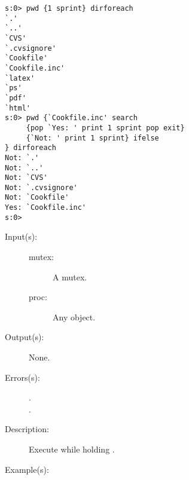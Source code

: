 \begin{description}
\begin{description}
\begin{verbatim}
s:0> pwd {1 sprint} dirforeach
`.'
`..'
`CVS'
`.cvsignore'
`Cookfile'
`Cookfile.inc'
`latex'
`ps'
`pdf'
`html'
s:0> pwd {`Cookfile.inc' search
     {pop `Yes: ' print 1 sprint pop exit}
     {`Not: ' print 1 sprint} ifelse
} dirforeach
Not: `.'
Not: `..'
Not: `CVS'
Not: `.cvsignore'
Not: `Cookfile'
Yes: `Cookfile.inc'
s:0>
		\end{verbatim}
	\end{description}
\label{systemdict:monitor}
\item[{\stilop{mutex proc}{monitor}{--}}: ]
	\begin{description}\item[]
	\item[Input(s): ]
		\begin{description}\item[]
		\item[mutex: ]
			A mutex.
		\item[proc: ]
			Any object.
		\end{description}
	\item[Output(s): ] None.
	\item[Errors(s): ]
		\begin{description}\item[]
		\item[.]
		\item[.]
		\end{description}
	\item[Description: ]
		Execute  while holding .
	\item[Example(s): ]\begin{verbatim}


\end{verbatim}
\end{description}
\end{description}
